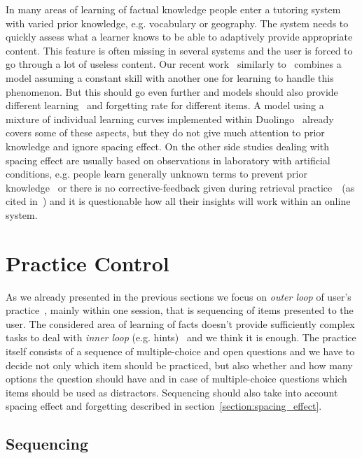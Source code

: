 \documentclass[table,color,cover,twoside,nolot,nolof]{fithesis3/fithesis3}
\begin{document}
\noindent
In many areas of learning of factual knowledge people enter a tutoring system
with varied prior knowledge, e.g. vocabulary or geography. The system needs to
quickly assess what a learner knows to be able to adaptively provide appropriate
content. This feature is often missing in several systems and the user is
forced to go through a lot of useless content. Our recent
work~\cite{papousek2014adaptive} similarly to~\cite{khajah2014integrating}
combines a model assuming a constant skill with another one for learning to
handle this phenomenon.  But this should go even further and models should also
provide different learning~\cite{pelanek2015modeling} and forgetting rate for
different items.  A model using a mixture of individual learning curves
implemented within Duolingo~\cite{streeter2015mixture} already covers some of
these aspects, but they do not give much attention to prior knowledge and
ignore spacing effect.  On the other side studies dealing with spacing effect
are usually based on observations in laboratory with artificial conditions, e.g.
people learn generally unknown terms to prevent prior
knowledge~\cite{kang2014retrieval} or there is no corrective-feedback given
during retrieval practice~\cite{landauer1978optimum}~(as cited
in~\cite{kang2014retrieval}) and it is questionable how all their insights will
work within an online system.

\section{Practice Control}
\label{section:practice_control}

As we already presented in the previous sections we focus on \emph{outer loop}
of user's practice~\cite{vanlehn2006behavior}, mainly within one session, that
is sequencing of items presented to the user. The considered area of learning
of facts doesn't provide sufficiently complex tasks to deal with \emph{inner
loop} (e.g. hints)~\cite{vanlehn2006behavior} and we think it is enough. The
practice itself consists of a sequence of multiple-choice and open
questions and we have to decide not only which item should be practiced, but
also whether and how many options the question should have and in case of
multiple-choice questions which items should be used as distractors. Sequencing
should also take into account spacing effect and forgetting described in
section~\ref{section:spacing_effect}.

\subsection{Sequencing}
\end{document}
